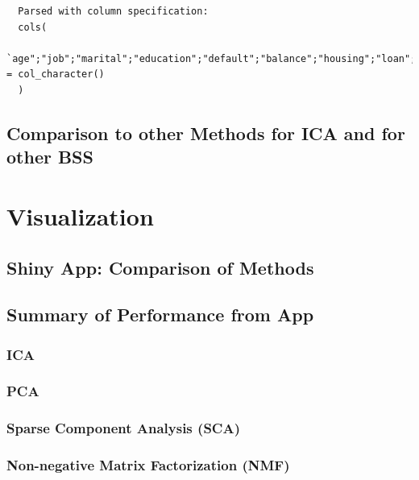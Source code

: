 \documentclass[12pt,twoside]{amherstthesis}
\begin{document}
  \begin{verbatim}
  Parsed with column specification:
  cols(
    `age";"job";"marital";"education";"default";"balance";"housing";"loan";"contact";"day";"month";"duration";"campaign";"pdays";"previous";"poutcome";"y` = col_character()
  )
  \end{verbatim}
  
  \section{Comparison to other Methods for ICA and for other
  BSS}\label{comparison-to-other-methods-for-ica-and-for-other-bss}
  
  \chapter{Visualization}\label{visualization}
  
  \section{Shiny App: Comparison of
  Methods}\label{shiny-app-comparison-of-methods}
  
  \section{Summary of Performance from
  App}\label{summary-of-performance-from-app}
  
  \subsection{ICA}\label{ica}
  
  \subsection{PCA}\label{pca}
  
  \subsection{Sparse Component Analysis
  (SCA)}\label{sparse-component-analysis-sca}
  
  \subsection{Non-negative Matrix Factorization
  (NMF)}\label{non-negative-matrix-factorization-nmf}
  
  \chapter{}\label{section}
  
\end{document}
